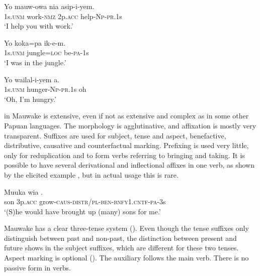 \ea%
\label{ex:1:x1523}
\gll Yo  mauw-owa  nia  asip-i-yem. \\
 1s.\textsc{unm}  work-\textsc{nmz}  2p.\textsc{acc}  help-\textsc{Np}-\textsc{pr}.1s     \\
\glt `I help you with work.'
\z


\ea%
\label{ex:1:x1524}
\gll Yo  koka=pa  ik-e-m. \\
1s.\textsc{unm}  jungle=\textsc{loc}  be-\textsc{pa}-1s      \\
\glt `I was in the jungle.'
\z


\ea%
\label{ex:1:x1525}
\gll Yo  wailal-i-yem  a. \\
 1s.\textsc{unm}  hunger-\textsc{Np}-\textsc{pr}.1s  oh     \\
\glt `Oh, I'm hungry.'
\z


 in Mauwake is extensive, even if not as extensive and complex as in some other Papuan languages. The morphology is agglutinative, and  affixation is mostly very transparent.  Suffixes are used for subject, tense and aspect, benefactive, distributive, causative and counterfactual marking. Prefixing is used very little, only for reduplication and to form verbs referring to bringing and taking. It is possible to have several derivational and inflectional affixes in one verb, as shown by the elicited example , but in actual usage this is rare.


\ea%
\label{ex:1:x664}
\gll Muuka  wia . \\
 son  3p.\textsc{acc}  grow-\textsc{caus}-\textsc{distr/pl}-\textsc{ben}-\textsc{bnfy1.cntf-pa}-3s     \\
\glt `(S)he would have brought up (many) sons for me.'
\z


Mauwake has a clear three-tense system (). Even though the tense suffixes only distinguish between past and non-past, the distinction between present and future shows in the subject suffixes, which are different for these two tenses.  Aspect marking is optional ().  The auxiliary follows the main verb. There is no passive form in verbs.

